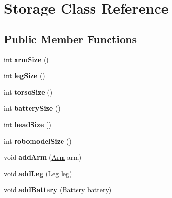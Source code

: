 \hypertarget{classStorage}{}\section{Storage Class Reference}
\label{classStorage}
\subsection*{Public Member Functions}
\begin{DoxyCompactItemize}
\item 
int {\bfseries arm\+Size} ()\hypertarget{classStorage_a098d6f5a35c9530389fb5d00b3199d55}{}\label{classStorage_a098d6f5a35c9530389fb5d00b3199d55}

\item 
int {\bfseries leg\+Size} ()\hypertarget{classStorage_a6745287fc1fe39b78c4e138eacb967b9}{}\label{classStorage_a6745287fc1fe39b78c4e138eacb967b9}

\item 
int {\bfseries torso\+Size} ()\hypertarget{classStorage_ae350d26db3f9921b036d083d26d6a360}{}\label{classStorage_ae350d26db3f9921b036d083d26d6a360}

\item 
int {\bfseries battery\+Size} ()\hypertarget{classStorage_afb62f238df6e371caa6c7da2911b6862}{}\label{classStorage_afb62f238df6e371caa6c7da2911b6862}

\item 
int {\bfseries head\+Size} ()\hypertarget{classStorage_a71250cea29a2f5d83c3ca79f40a0137c}{}\label{classStorage_a71250cea29a2f5d83c3ca79f40a0137c}

\item 
int {\bfseries robomodel\+Size} ()\hypertarget{classStorage_a73862fc839b63e8aca653e66863d3710}{}\label{classStorage_a73862fc839b63e8aca653e66863d3710}

\item 
void {\bfseries add\+Arm} (\hyperlink{classArm}{Arm} arm)\hypertarget{classStorage_a57d4e9f8069d220a351b52ac5f1ba1e1}{}\label{classStorage_a57d4e9f8069d220a351b52ac5f1ba1e1}

\item 
void {\bfseries add\+Leg} (\hyperlink{classLeg}{Leg} leg)\hypertarget{classStorage_a6f20e2bf07ed902d155fcfb0db55971c}{}\label{classStorage_a6f20e2bf07ed902d155fcfb0db55971c}

\item 
void {\bfseries add\+Battery} (\hyperlink{classBattery}{Battery} battery)\hypertarget{classStorage_a033f54af2591205b2af2c1c42883df69}{}\label{classStorage_a033f54af2591205b2af2c1c42883df69}


\end{DoxyCompactItemize}
